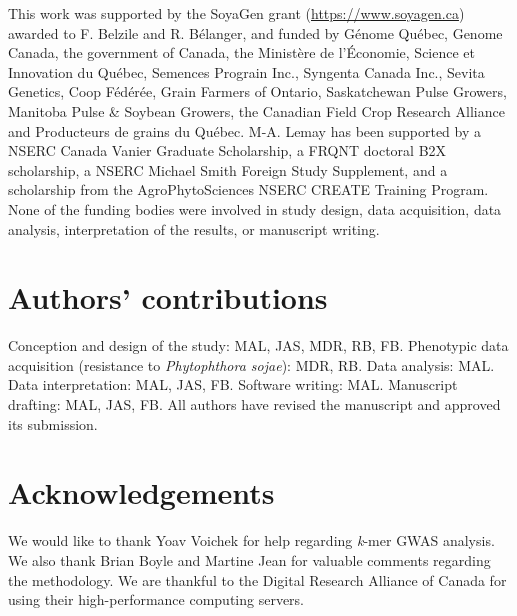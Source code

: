 This work was supported by the SoyaGen grant (\url{https://www.soyagen.ca})
awarded to F. Belzile and R. Bélanger, and funded by Génome Québec, Genome
Canada, the government of Canada, the Ministère de l'Économie, Science et
Innovation du Québec, Semences Prograin Inc., Syngenta Canada Inc., Sevita
Genetics, Coop Fédérée, Grain Farmers of Ontario, Saskatchewan Pulse Growers,
Manitoba Pulse \& Soybean Growers, the Canadian Field Crop Research Alliance
and Producteurs de grains du Québec. M-A. Lemay has been supported by a NSERC
Canada Vanier Graduate Scholarship, a FRQNT doctoral B2X scholarship, a NSERC
Michael Smith Foreign Study Supplement, and a scholarship from the
AgroPhytoSciences NSERC CREATE Training Program. None of the funding bodies
were involved in study design, data acquisition, data analysis, interpretation
of the results, or manuscript writing.

\section*{Authors' contributions}
\label{sv-gwas-contributions}

Conception and design of the study: MAL, JAS, MDR, RB, FB.
Phenotypic data acquisition (resistance to \textit{Phytophthora sojae}): MDR, RB.
Data analysis: MAL.
Data interpretation: MAL, JAS, FB.
Software writing: MAL.
Manuscript drafting: MAL, JAS, FB.
All authors have revised the manuscript and approved its submission.

\section*{Acknowledgements}
\label{sv-gwas-acknowledgwments}

We would like to thank Yoav Voichek for help regarding \textit{k}-mer GWAS
analysis.  We also thank Brian Boyle and Martine Jean for valuable comments
regarding the methodology. We are thankful to the Digital Research Alliance of
Canada for using their high-performance computing servers.




